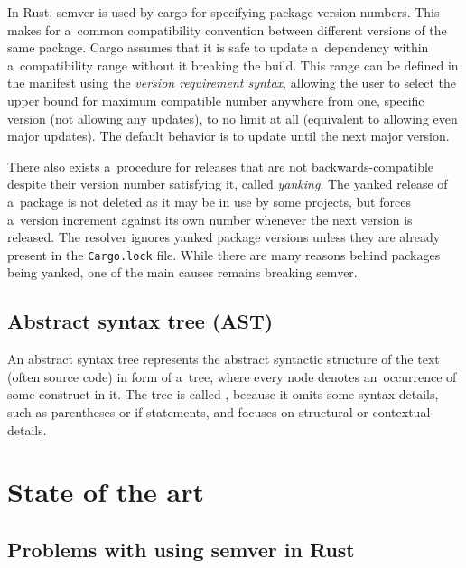 \documentclass[licencjacka,en]{pracamgr}
\begin{document}
In Rust, semver is used by cargo for specifying package version numbers. This makes for a~common
compatibility convention between different versions of the same package. Cargo assumes that
it is safe to update a~dependency within a~compatibility range without it breaking the build.
This range can be defined in the manifest using the \textit{version requirement syntax}, allowing
the user to select the upper bound for maximum compatible number anywhere from one, specific
version (not allowing any updates), to no limit at all (equivalent to allowing even major updates).
The default behavior is to update until the next major version.

There also exists a~procedure for releases that are not backwards-compatible despite their version
number satisfying it, called \textit{yanking}. The yanked release of a~package is not
deleted as it may be in use by some projects, but forces a~version increment against its own number
whenever the next version is released. The resolver ignores yanked package versions unless they are
already present in the \texttt{Cargo.lock} file. While there are many reasons behind packages being
yanked, one of the main causes remains breaking semver.

\section{Abstract syntax tree (AST)}\label{r:section_ast}

An abstract syntax tree represents the abstract syntactic structure of the text (often source code)
in form of a~tree, where every node denotes an~occurrence of some construct in it. The tree is
called , because it omits some syntax details, such as parentheses or if statements,
and focuses on structural or contextual details.



\chapter{State of the art}\label{r:chapter_state_of_the_art}

\section{Problems with using semver in Rust}\label{r:section_rust_semver_problems}
\end{document}
